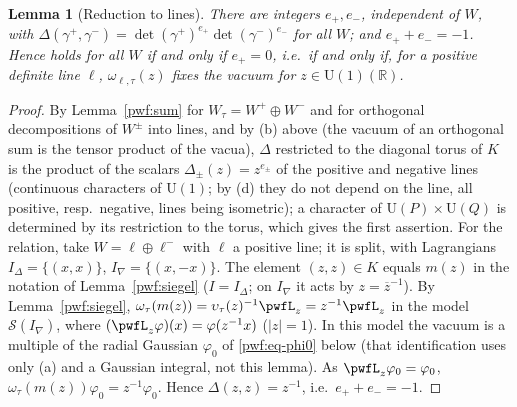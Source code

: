 \documentclass[10pt]{amsart}
\newtheorem{lemma}[theorem]{Lemma}
\theoremstyle{definition}
\theoremstyle{remark}
\newcommand{\R}{\mathbb R}
\providecommand{\auS}{\mathcal S}
\providecommand{\auU}{\mathrm U}
\providecommand{\aubar}[1]{\overline{#1}}
\begin{document}
\begin{lemma}[Reduction to lines]\label{pwf:delta-red}
There are integers $e_+,e_-$, independent of $W$, with $\Delta(\gamma^+,\gamma^-)=\det(\gamma^+)^{e_+}
\det(\gamma^-)^{e_-}$ for all $W$; and $e_++e_-=-1$. Hence {\cite[(30)]{P54}} holds for all $W$
if and only if $e_+=0$, i.e.\ if and only if, for a positive definite line $\ell$, $\omega_{\ell,\tau}(z)$
fixes the vacuum for $z\in\auU(1)(\R)$.
\end{lemma}
\begin{proof}
By Lemma~\ref{pwf:sum} for $W_\tau=W^+\oplus W^-$ and for orthogonal decompositions of $W^\pm$ into
lines, and by (b) above (the vacuum of an orthogonal sum is the tensor product of the vacua),
$\Delta$ restricted to the diagonal torus of $K$ is the product of the scalars $\Delta_\pm(z)=
z^{e_\pm}$ of the positive and negative lines (continuous characters of $\auU(1)$; by (d) they do not
depend on the line, all positive, resp.\ negative, lines being isometric); a character of $\auU(P)\times\auU(Q)$ is determined by its
restriction to the torus, which gives the first assertion. For the relation, take $W=\ell\oplus\ell^-$
with $\ell$ a positive line; it is split, with Lagrangians $I_\Delta=\{(x,x)\}$, $I_\nabla=
\{(x,-x)\}$. The element $(z,z)\in K$ equals $m(z)$ in the notation of Lemma~\ref{pwf:siegel}
($I=I_\Delta$; on $I_\nabla$ it acts by $z=\aubar z^{-1}$). By Lemma~\ref{pwf:siegel},
$\omega_\tau(m(z))=\upsilon_\tau(z)^{-1}\pwfL_z=z^{-1}\pwfL_z$ in the model $\auS(I_\nabla)$, where
$(\pwfL_z\varphi)(x)=\varphi(z^{-1}x)$ ($|z|=1$). In this model the vacuum is a multiple of the radial
Gaussian $\varphi_0$ of \eqref{pwf:eq-phi0} below (that identification uses only (a) and a Gaussian
integral, not this lemma). As $\pwfL_z\varphi_0=\varphi_0$, $\omega_\tau(m(z))\varphi_0=z^{-1}\varphi_0$.
Hence $\Delta(z,z)=z^{-1}$, i.e.\ $e_++e_-=-1$.
\end{proof}
\end{document}

